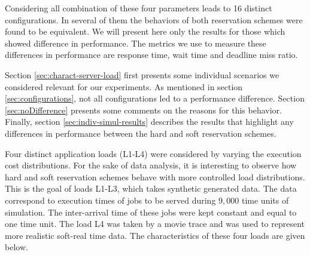 \documentclass[times, 10pt,twocolumn]{article}
\begin{document}
Considering all combination of these four parameters leads to 16
distinct configurations. In several of them the behaviors of both
reservation schemes were found to be equivalent.  We will present here
only the results for those which showed difference in performance.
The metrics we use to measure these differences in performance are
response time, wait time and deadline miss ratio.

\label{sec:simulation-results}

Section \ref{sec:charact-server-load} first presents some individual
scenarios we considered relevant for our experiments. As mentioned in
section \ref{sec:configurations}, not all configurations led to a
performance difference. Section \ref{sec:noDifference} presents some
comments on the reasons for this behavior. Finally, section
\ref{sec:indiv-simul-results} describes the results that highlight any
differences in performance between the hard and soft reservation
schemes.

\label{sec:charact-server-load}

Four distinct application loads (L1-L4) were considered by varying the
execution cost distributions.  For the sake of data analysis, it is
interesting to observe how hard and soft reservation schemes behave
with more controlled load distributions. This is the goal of loads
L1-L3, which takes synthetic generated data. The data correspond to
execution times of jobs to be served during $9,000$ time units of
simulation.  The inter-arrival time of these jobs were kept constant
and equal to one time unit.  The load L4 was taken by a movie trace
and was used to represent more realistic soft-real time data. The
characteristics of these four loads are given below.
\end{document}
